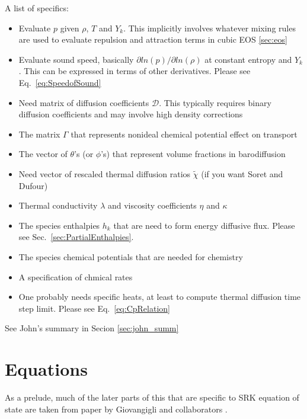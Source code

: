 \documentclass[11pt]{article}
\begin{document}
A list of specifics:
\begin{itemize}
\item Evaluate $p$ given $\rho$, $T$ and $Y_k$. This implicitly involves whatever mixing rules are used to
    evaluate repulsion and attraction terms in cubic EOS \ref{sec:eos}
\item Evaluate sound speed, basically $\partial ln(p)/ \partial ln(\rho)$ at constant entropy and $Y_k$. This
can be expressed in terms of other derivatives. Please see Eq.~\ref{eq:SpeedofSound}
\item Need matrix of diffusion coefficients $\mathcal{D}$.  This typically requires binary diffusion coefficients and may involve high density corrections
\item The matrix $\Gamma$ that represents nonideal chemical potential effect on transport
\item The vector of $\theta$'s (or $\phi$'s) that represent volume fractions in barodiffusion
\item Need vector of rescaled thermal diffusion ratios $\tilde{\chi}$ (if you want Soret and Dufour)
\item Thermal conductivity $\lambda$ and viscosity coefficients $\eta$ and $\kappa$
\item The species enthalpies $h_k$ that are need to form energy diffusive flux. Please see Sec.~\ref{sec:PartialEnthalpies}. 
\item The species chemical potentials that are needed for chemistry
\item A specification of chmical rates
\item One probably needs specific heats, at least to compute thermal diffusion time step limit. Please see Eq.~\ref{eq:CpRelation}
\end{itemize}

See John's summary in Secion \ref{sec:john_summ}



\section{Equations}

As a prelude, much of the later parts of this that are specific to SRK equation of state are taken from 
paper by Giovangigli and collaborators \cite{giovangigli_CTM:2011,giovangigli:2012}.
\end{document}

